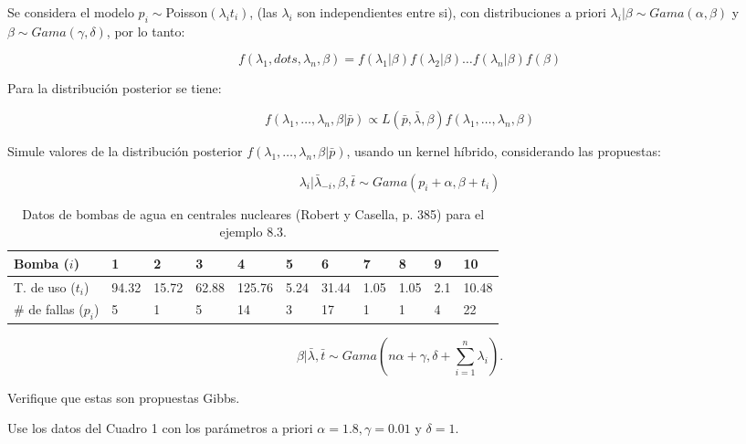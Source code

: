 \documentclass{article}
\begin{document}
\begin{enumerate}
    Se considera el modelo $p_i \sim $Poisson$(\lambda_i t_i)$, (las $\lambda_i$ 
    son independientes entre si), con distribuciones a priori $\lambda_i|\beta 
    \sim Gama(\alpha, \beta)$ y $\beta \sim Gama(\gamma, \delta)$, por lo tanto:
    
    \[f (\lambda_1, dots , \lambda_n, \beta) = f (\lambda_1|\beta)f (\lambda_2|
    \beta) \dots f(\lambda_n|\beta)f(\beta)\]
    
    Para la distribución posterior se tiene:
    
    \[f (\lambda_1, \dots , \lambda_n, \beta|\bar p) \propto L(\bar p, \bar \lambda,
     \beta)f (\lambda_1, \dots , \lambda_n, \beta)\]
    
    Simule valores de la distribución posterior $f (\lambda_1, \dots , \lambda_n, 
    \beta|\bar p)$, usando un kernel híbrido, considerando las propuestas: 
    
    \[\lambda_i|\bar \lambda_{-i}, \beta, \bar t \sim Gama(p_i + \alpha , \beta + 
    t_i)\]

    \begin{table}[!h] \centering
        \begin{tabular}{|l|l|l|l|l|l|l|l|l|l|l|}
            \hline
            Bomba ($i$)         & 1     & 2     & 3     & 4      & 5    & 6     & 7    & 8    & 9   & 10    \\ \hline
            T. de uso ($t_i$)    & 94.32 & 15.72 & 62.88 & 125.76 & 5.24 & 31.44 & 1.05 & 1.05 & 2.1 & 10.48 \\ \hline
            \# de fallas ($p_i$) & 5     & 1     & 5     & 14     & 3    & 17    & 1    & 1    & 4   & 22    \\ \hline
        \end{tabular} 
        \label{tab1}
        \caption{Datos de bombas de agua en centrales nucleares (Robert y Casella,
        p. 385) para el ejemplo 8.3.}
    \end{table}



    \[\beta|\bar \lambda, \bar t \sim Gama \left( n\alpha + \gamma , \delta + 
    \sum_{i=1}^n\lambda_i \right).\]
    
    Verifique que estas son propuestas Gibbs.

    Use los datos del Cuadro 1 con los parámetros a priori $\alpha = 1.8, 
    \gamma = 0.01$ y $\delta = 1$.


   
\end{enumerate}




 
\end{document}
